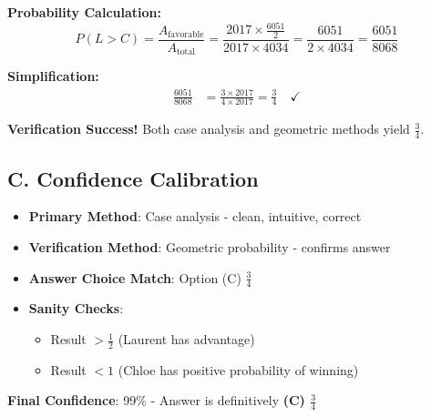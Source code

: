 \documentclass[]{article}
\begin{document}
\begin{verificationbox}
\textbf{Probability Calculation:}
\[P(L > C) = \frac{A_{\text{favorable}}}{A_{\text{total}}} = \frac{2017 \times \frac{6051}{2}}{2017 \times 4034} = \frac{6051}{2 \times 4034} = \frac{6051}{8068}\]

\textbf{Simplification:}
\begin{align*}
\frac{6051}{8068} &= \frac{3 \times 2017}{4 \times 2017} = \frac{3}{4} \quad \checkmark
\end{align*}

\textbf{Verification Success!} Both case analysis and geometric methods yield $\boxed{\frac{3}{4}}$.

\subsection*{C. Confidence Calibration}
\begin{itemize}[leftmargin=*]
    \item \textbf{Primary Method}: Case analysis - clean, intuitive, correct \checkmark
    \item \textbf{Verification Method}: Geometric probability - confirms answer \checkmark
    \item \textbf{Answer Choice Match}: Option (C) $\frac{3}{4}$ \checkmark
    \item \textbf{Sanity Checks}: 
    \begin{itemize}
        \item Result $> \frac{1}{2}$ (Laurent has advantage) \checkmark
        \item Result $< 1$ (Chloe has positive probability of winning) \checkmark
    \end{itemize}
\end{itemize}

\textbf{Final Confidence}: 99\% - Answer is definitively \textbf{(C) $\frac{3}{4}$}
\end{verificationbox}
\end{document}
